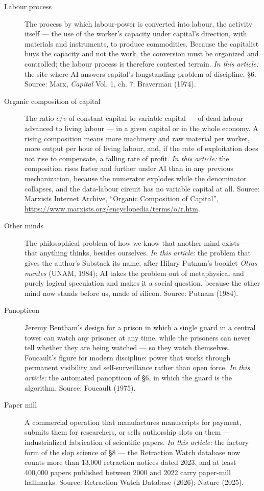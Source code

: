\documentclass[11pt]{article}
\begin{document}
\begin{description}
\item[Labour process] The process by which labour-power is converted
into labour, the activity itself --- the use of the worker's capacity
under capital's direction, with materials and instruments, to produce
commodities. Because the capitalist buys the capacity and not the work,
the conversion must be organized and controlled; the labour process is
therefore contested terrain. \emph{In this article:} the site where AI
answers capital's longstanding problem of discipline, \S 6. Source:
Marx, \textit{Capital} Vol. 1, ch. 7; Braverman (1974).

\item[Organic composition of capital] The ratio $c/v$ of constant capital
to variable capital --- of dead labour advanced to living labour --- in
a given capital or in the whole economy. A rising composition means more
machinery and raw material per worker, more output per hour of living
labour, and, if the rate of exploitation does not rise to compensate, a
falling rate of profit. \emph{In this article:} the composition rises
faster and further under AI than in any previous mechanization, because
the numerator explodes while the denominator collapses, and the
data-labour circuit has no variable capital at all. Source: Marxists
Internet Archive, ``Organic Composition of Capital'',
\url{https://www.marxists.org/encyclopedia/terms/o/r.htm}.

\item[Other minds] The philosophical problem of how we know that
another mind exists --- that anything thinks, besides ourselves.
\emph{In this article:} the problem that gives the author's Substack
its name, after Hilary Putnam's booklet \textit{Otras mentes} (UNAM,
1984); AI takes the problem out of metaphysical and purely logical
speculation and makes it a social question, because the other mind now
stands before us, made of silicon. Source: Putnam (1984).

\item[Panopticon] Jeremy Bentham's design for a prison in which a single
guard in a central tower can watch any prisoner at any time, while the
prisoners can never tell whether they are being watched --- so they
watch themselves. Foucault's figure for modern discipline: power that
works through permanent visibility and self-surveillance rather than
open force. \emph{In this article:} the automated panopticon of \S 6,
in which the guard is the algorithm. Source: Foucault (1975).

\item[Paper mill] A commercial operation that manufactures manuscripts
for payment, submits them for researchers, or sells authorship slots
on them --- industrialized fabrication of scientific papers. \emph{In
this article:} the factory form of the slop science of \S 8 ---
the Retraction Watch database now counts more than 13,000 retraction
notices dated 2023, and at least 400,000 papers published between 2000
and 2022 carry paper-mill hallmarks. Source: Retraction Watch Database
(2026); Nature (2025).


\end{description}
\end{document}
